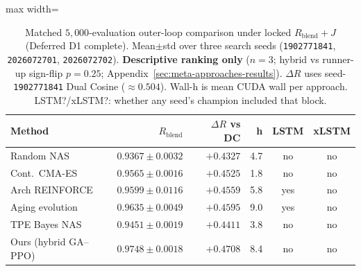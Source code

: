 \begin{table}[htbp]
  \centering
  \caption{Matched $5{,}000$-evaluation outer-loop comparison under locked $R_{\mathrm{blend}}{+}J$ (Deferred D1 complete).
    Mean$\pm$std over three search seeds (\texttt{1902771841}, \texttt{2026072701}, \texttt{2026072702}).
    \textbf{Descriptive ranking only} ($n{=}3$; hybrid vs runner-up sign-flip $p{=}0.25$; Appendix~\ref{sec:meta-approaches-results}).
    $\Delta R$ uses seed-\texttt{1902771841} Dual Cosine (${\approx}0.504$). Wall-h is mean CUDA wall per approach.
    LSTM?/xLSTM?: whether any seed's champion included that block.}
  \label{tab:meta-approaches}
  \setlength{\tabcolsep}{2pt}
  \scriptsize
  \begin{adjustbox}{max width=\columnwidth}
\begin{tabular}{@{}lrrrcc@{}}
    \toprule
    Method & $R_{\mathrm{blend}}$ & $\Delta R$ vs DC & h & LSTM & xLSTM \\
    \midrule
    Random NAS & $0.9367{\pm}0.0032$ & $+0.4327$ & 4.7 & no & no \\
    Cont.\ CMA-ES & $0.9565{\pm}0.0016$ & $+0.4525$ & 1.8 & no & no \\
    Arch REINFORCE & $0.9599{\pm}0.0116$ & $+0.4559$ & 5.8 & yes & no \\
    Aging evolution & $0.9635{\pm}0.0049$ & $+0.4595$ & 9.0 & yes & no \\
    TPE Bayes NAS & $0.9451{\pm}0.0019$ & $+0.4411$ & 3.8 & no & no \\
    Ours (hybrid GA--PPO) & $0.9748{\pm}0.0018$ & $+0.4708$ & 8.4 & no & no \\
    \bottomrule
  \end{tabular}
\end{adjustbox}
\end{table}
